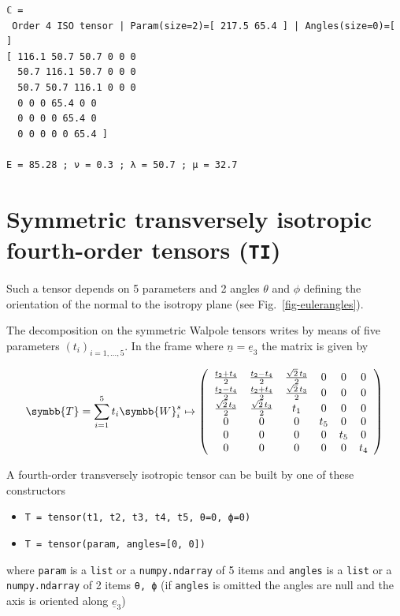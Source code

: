 \documentclass[
  a4paper,
  numbers=noendperiod,
  DIV=12]{scrreprt}
\providecommand{\tightlist}{%
  \setlength{\itemsep}{0pt}\setlength{\parskip}{0pt}}
\newcommand{\uuuu}[1]{{\symbb{{#1}}}}
\newcommand{\uv}[1]{{\underline{{#1}}}}
\newcommand{\ve}[1]{{\uv{{e}}_{{#1}}}}
\begin{document}
\begin{verbatim}
ℂ =
 Order 4 ISO tensor | Param(size=2)=[ 217.5 65.4 ] | Angles(size=0)=[ ]
[ 116.1 50.7 50.7 0 0 0 
  50.7 116.1 50.7 0 0 0 
  50.7 50.7 116.1 0 0 0 
  0 0 0 65.4 0 0 
  0 0 0 0 65.4 0 
  0 0 0 0 0 65.4 ]

E = 85.28 ; ν = 0.3 ; λ = 50.7 ; μ = 32.7
\end{verbatim}

\section{\texorpdfstring{Symmetric transversely isotropic fourth-order
tensors
(\texttt{TI})}{Symmetric transversely isotropic fourth-order tensors (TI)}}\label{symmetric-transversely-isotropic-fourth-order-tensors-ti}

Such a tensor depends on 5 parameters and 2 angles \(\theta\) and
\(\phi\) defining the orientation of the normal to the isotropy plane
(see Fig.~\ref{fig-eulerangles}).

The decomposition on the symmetric Walpole tensors writes by means of
five parameters \((t_i)_{i=1,\ldots,5}\). In the frame where
\(\uv{n}=\ve{3}\) the matrix is given by

\[
\uuuu{T}=\sum_{i=1}^5 t_i \uuuu{W}^s_i
\mapsto
\left(
\begin{array}{cccccc}
\frac{t_2 + t_4}{2} & \frac{t_2 - t_4}{2} & \frac{\sqrt{2} \, t_3}{2} & 0 & 0 & 0 \\
\frac{t_2 - t_4}{2} & \frac{t_2 + t_4}{2} & \frac{\sqrt{2} \, t_3}{2} & 0 & 0 & 0 \\
\frac{\sqrt{2} \, t_3}{2} & \frac{\sqrt{2} \, t_3}{2} & t_1 & 0 & 0 & 0 \\
0 & 0 & 0 & t_5 & 0 & 0 \\
0 & 0 & 0 & 0 & t_5 & 0 \\
0 & 0 & 0 & 0 & 0 & t_4 \\
\end{array}
\right)
\]

A fourth-order transversely isotropic tensor can be built by one of
these constructors

\begin{itemize}
\tightlist
\item
  \texttt{T\ =\ tensor(t1,\ t2,\ t3,\ t4,\ t5,\ θ=0,\ ϕ=0)}
\item
  \texttt{T\ =\ tensor(param,\ angles={[}0,\ 0{]})}
\end{itemize}

where \texttt{param} is a \texttt{list} or a \texttt{numpy.ndarray} of 5
items and \texttt{angles} is a \texttt{list} or a \texttt{numpy.ndarray}
of 2 items \texttt{θ,\ ϕ} (if \texttt{angles} is omitted the angles are
null and the axis is oriented along \(\ve{3}\))
\end{document}
